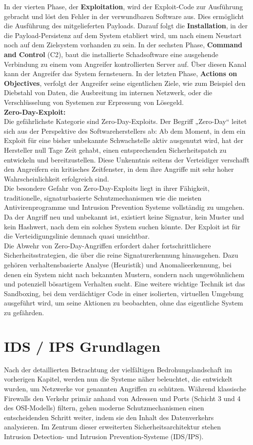 In der vierten Phase, der \textbf{Exploitation}, wird der Exploit-Code zur Ausführung gebracht und löst den Fehler in der verwundbaren Software aus. Dies ermöglicht die Ausführung des mitgelieferten Payloads. Darauf folgt die \textbf{Installation}, in der die Payload-Persistenz auf dem System etabliert wird, um nach einem Neustart noch auf dem Zielsystem vorhanden zu sein. In der sechsten Phase, \textbf{Command and Control} (C2), baut die installierte Schadsoftware eine ausgehende Verbindung zu einem vom Angreifer kontrollierten Server auf. Über diesen Kanal kann der Angreifer das System fernsteuern. In der letzten Phase, \textbf{Actions on Objectives}, verfolgt der Angreifer seine eigentlichen Ziele, wie zum Beispiel den Diebstahl von Daten, die Ausbreitung im internen Netzwerk, oder die Verschlüsselung von Systemen zur Erpressung von Lösegeld.\cite{wik1}\\
\newpage
\textbf{Zero-Day-Exploit:}\\
Die gefährlichste Kategorie sind Zero-Day-Exploits. Der Begriff „Zero-Day“ leitet sich aus der Perspektive des Softwareherstellers ab: Ab dem Moment, in dem ein Exploit für eine bisher unbekannte Schwachstelle aktiv ausgenutzt wird, hat der Hersteller null Tage Zeit gehabt, einen entsprechenden Sicherheitspatch zu entwickeln und bereitzustellen. Diese Unkenntnis seitens der Verteidiger verschafft den Angreifern ein kritisches Zeitfenster, in dem ihre Angriffe mit sehr hoher Wahrscheinlichkeit erfolgreich sind.\\
Die besondere Gefahr von Zero-Day-Exploits liegt in ihrer Fähigkeit, traditionelle, signaturbasierte Schutzmechanismen wie die meisten Antivirenprogramme und Intrusion Prevention Systeme vollständig zu umgehen. Da der Angriff neu und unbekannt ist, existiert keine Signatur, kein Muster und kein Hashwert, nach dem ein solches System suchen könnte. Der Exploit ist für die Verteidigungslinie demnach quasi unsichtbar.\\
Die Abwehr von Zero-Day-Angriffen erfordert daher fortschrittlichere Sicherheitsstrategien, die über die reine Signaturerkennung hinausgehen. Dazu gehören verhaltensbasierte Analyse (Heuristik) und Anomalieerkennung, bei denen ein System nicht nach bekannten Mustern, sondern nach ungewöhnlichem und potenziell bösartigem Verhalten sucht. Eine weitere wichtige Technik ist das Sandboxing, bei dem verdächtiger Code in einer isolierten, virtuellen Umgebung ausgeführt wird, um seine Aktionen zu beobachten, ohne das eigentliche System zu gefährden.
\newpage
\section{IDS / IPS Grundlagen}
Nach der detaillierten Betrachtung der vielfältigen Bedrohungslandschaft im vorherigen Kapitel, werden nun die Systeme näher beleuchtet, die entwickelt wurden, um Netzwerke vor genannten Angriffen zu schützen. Während klassische Firewalls den Verkehr primär anhand von Adressen und Ports (Schicht 3 und 4 des OSI-Modells) filtern, gehen moderne Schutzmechanismen einen entscheidenden Schritt weiter, indem sie den Inhalt des Datenverkehrs analysieren. Im Zentrum dieser erweiterten Sicherheitsarchitektur stehen Intrusion Detection- und Intrusion Prevention-Systeme (IDS/IPS).

